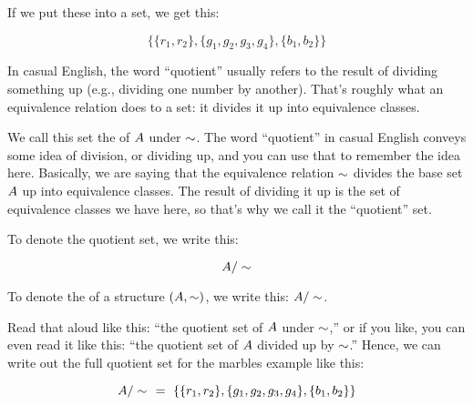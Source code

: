 \documentclass[../../../main.tex]{subfiles}
\begin{document}
If we put these into a set, we get this:

\begin{equation*}
  \{ \{ r_{1}, r_{2} \},
  \{ g_{1}, g_{2}, g_{3}, g_{4} \},
  \{ b_{1}, b_{2} \} \}
\end{equation*}

\begin{aside}
  \begin{remark}
    In casual English, the word ``quotient'' usually refers to the result of dividing something up (e.g., dividing one number by another). That's roughly what an equivalence relation does to a set: it divides it up into equivalence classes.
  \end{remark}
\end{aside}

We call this set the  of $A$ under $\equivalence/$. The word ``quotient'' in casual English conveys some idea of division, or dividing up, and you can use that to remember the idea here. Basically, we are saying that the equivalence relation $\equivalence/$ divides the base set $A$ up into equivalence classes. The result of dividing it up is the set of equivalence classes we have here, so that's why we call it the ``quotient'' set.

To denote the quotient set, we write this:

\begin{equation*}
  \quotientset{\set{A}}{\equivalence/}
\end{equation*}

\begin{aside}
  \begin{notation}
    To denote the  of a structure $(\set{A}, \equivalence/)$, we write this: $\quotientset{\set{A}}{\equivalence/}$.
  \end{notation}
\end{aside}

Read that aloud like this: ``the quotient set of $A$ under $\equivalence/$,'' or if you like, you can even read it like this: ``the quotient set of $A$ divided up by $\equivalence/$.'' Hence, we can write out the full quotient set for the marbles example like this:

\begin{equation*}
  \quotientset{\set{A}}{\equivalence/}~~=~
    \{ \{ r_{1}, r_{2} \},
    \{ g_{1}, g_{2}, g_{3}, g_{4} \},
    \{ b_{1}, b_{2} \} \}
\end{equation*}
\end{document}
